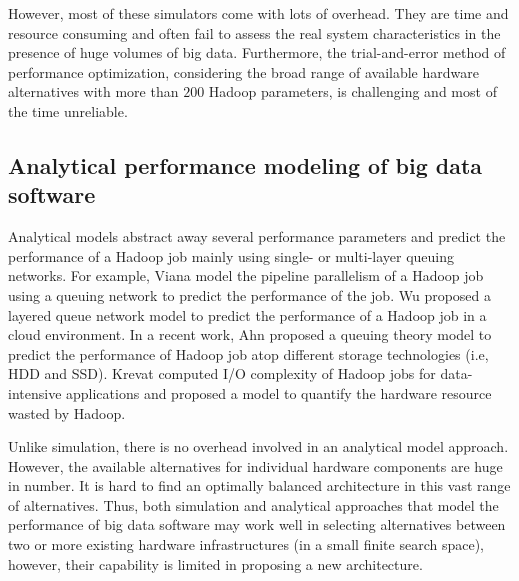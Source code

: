 \documentclass[journal]{IEEEtran}
\begin{document}
However, most of these simulators come with lots of overhead. They are time and resource consuming and often fail to assess the real system characteristics in the presence of huge volumes of big data. Furthermore, the trial-and-error method of performance optimization, considering the broad range of available hardware alternatives with more than $200$ Hadoop parameters, is challenging and most of the time unreliable.

\subsection{Analytical performance modeling of big data software}
Analytical models abstract away several performance parameters and predict the performance of a Hadoop job mainly using single- or multi-layer queuing networks. For example, Viana \cite{Model:vianna2013analytical} model the pipeline parallelism of a Hadoop job using a queuing network to predict the performance of the job.  Wu \cite{Model:wu2015exploring} proposed a layered queue network model to predict the performance of a Hadoop job in a cloud environment. In a recent work, Ahn \cite{Model:ahn2015analytical} proposed a queuing theory model to predict the performance of Hadoop job atop different storage technologies (i.e, HDD and SSD). Krevat \cite{Model:krevat2010applying} computed I/O complexity of Hadoop jobs for data-intensive applications and proposed a model to quantify the hardware resource wasted by Hadoop. 

Unlike simulation, there is no overhead involved in an analytical model approach. However, the available  alternatives for individual hardware components are huge in number. It is hard to find an optimally balanced architecture in this vast range of alternatives. Thus,  both simulation and analytical approaches that model the performance of big data software may work well in selecting alternatives between two or more existing hardware infrastructures (in a small finite search space), however, their capability is limited in proposing a new architecture.
\end{document}

